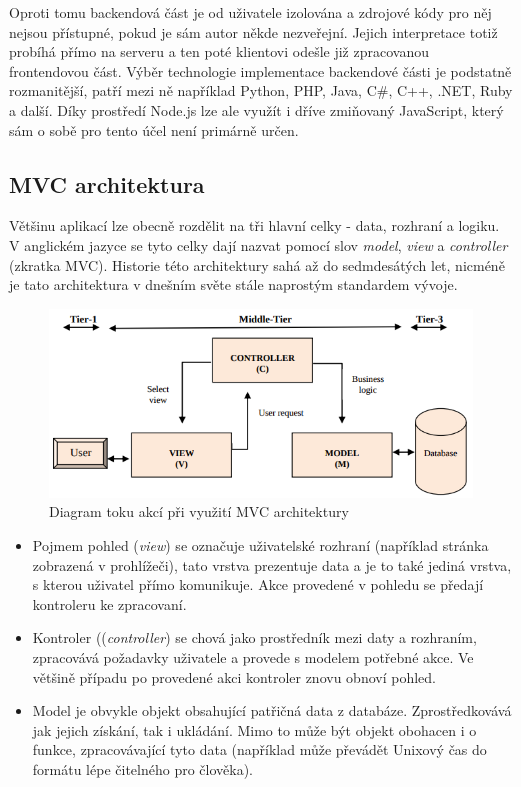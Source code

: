 Oproti tomu backendová část je od uživatele izolována a zdrojové kódy pro něj nejsou přístupné, pokud je sám autor někde nezveřejní. Jejich interpretace totiž probíhá přímo na serveru a ten poté klientovi odešle již zpracovanou frontendovou část. Výběr technologie implementace backendové části je podstatně rozmanitější, patří mezi ně například Python, PHP, Java, C#, C++, .NET, Ruby a další. Díky prostředí Node.js lze ale využít i dříve zmiňovaný JavaScript, který sám o sobě pro tento účel není primárně určen. 

\subsection{MVC architektura}
Většinu aplikací lze obecně rozdělit na tři hlavní celky - data, rozhraní a logiku. V anglickém jazyce se tyto celky dají nazvat pomocí slov \emph{model}, \emph{view} a \emph{controller} (zkratka MVC). Historie této architektury sahá až do sedmdesátých let, nicméně je tato architektura v dnešním světe stále naprostým standardem vývoje.

\begin{figure}[H]
	\centering
	\includegraphics[width=\textwidth]{images/mvc.png}
	\caption{Diagram toku akcí při využití MVC architektury}
	\label{mvc}
\end{figure}

\begin{itemize}
\item Pojmem pohled (\emph{view}) se označuje uživatelské rozhraní (například stránka zobrazená v prohlížeči), tato vrstva prezentuje data a je to také jediná vrstva, s kterou uživatel přímo komunikuje. Akce provedené v pohledu se předají kontroleru ke zpracovaní.
\item Kontroler ((\emph{controller}) se chová jako prostředník mezi daty a rozhraním, zpracovává požadavky uživatele a provede s modelem potřebné akce. Ve většině případu po provedené akci kontroler znovu obnoví pohled.
\item Model je obvykle objekt obsahující patřičná data z databáze. Zprostředkovává jak jejich získání, tak i ukládání. Mimo to může být objekt obohacen i o funkce, zpracovávající tyto data (například může převádět Unixový čas do formátu lépe čitelného pro člověka). 
\end{itemize}


